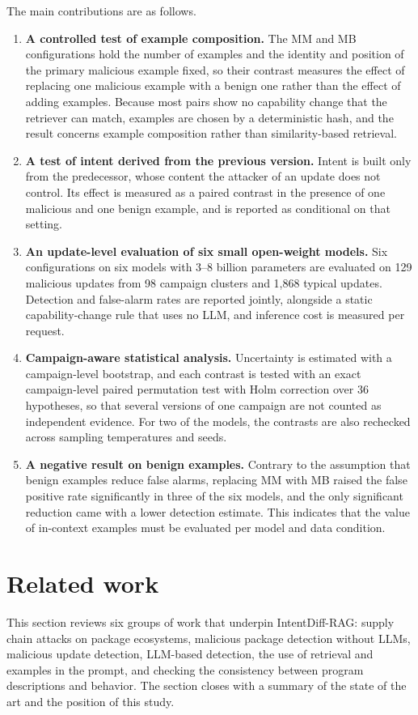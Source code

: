 \documentclass[a4paper,fleqn]{cas-dc}
\begin{document}
The main contributions are as follows.
\begin{enumerate}
\item \textbf{A controlled test of example composition.} The MM and MB
configurations hold the number of examples and the identity and position of the
primary malicious example fixed, so their contrast measures the effect of
replacing one malicious example with a benign one rather than the effect of
adding examples. Because most pairs show no capability change that the retriever
can match, examples are chosen by a deterministic hash, and the result concerns
example composition rather than similarity-based retrieval.
\item \textbf{A test of intent derived from the previous version.} Intent is
built only from the predecessor, whose content the attacker of an update does
not control. Its effect is measured as a paired contrast in the presence of one
malicious and one benign example, and is reported as conditional on that
setting.
\item \textbf{An update-level evaluation of six small open-weight models.} Six
configurations on six models with 3--8 billion parameters are evaluated on 129
malicious updates from 98 campaign clusters and 1,868 typical updates. Detection
and false-alarm rates are reported jointly, alongside a static
capability-change rule that uses no LLM, and inference cost is measured per
request.
\item \textbf{Campaign-aware statistical analysis.} Uncertainty is estimated
with a campaign-level bootstrap, and each contrast is tested with an exact
campaign-level paired permutation test with Holm correction over 36
hypotheses, so that several versions of one campaign are not counted as
independent evidence. For two of the models, the contrasts are also rechecked
across sampling temperatures and seeds.
\item \textbf{A negative result on benign examples.} Contrary to the assumption
that benign examples reduce false alarms, replacing MM with MB raised the false
positive rate significantly in three of the six models, and the only
significant reduction came with a lower detection estimate. This indicates that
the value of in-context examples must be evaluated per model and data condition.
\end{enumerate}

\section{Related work}\label{sec:related}
This section reviews six groups of work that underpin IntentDiff-RAG: supply
chain attacks on package ecosystems, malicious package detection without LLMs,
malicious update detection, LLM-based detection, the use of retrieval
and examples in the prompt, and checking the consistency between program
descriptions and behavior. The section closes with a summary of the state of
the art and the position of this study.
\end{document}
